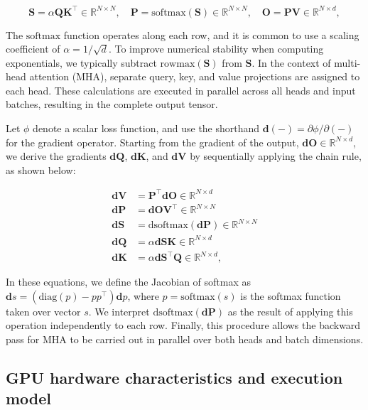 \begin{enumerate}
\begin{equation*}
  \mathbf{S} = \alpha \mathbf{Q} \mathbf{K}^\top \in \mathbb{R}^{N \times N}, \quad \mathbf{P} = \mathrm{softmax}(\mathbf{S}) \in \mathbb{R}^{N \times N}, \quad \mathbf{O} = \mathbf{P}\mathbf{V} \in \mathbb{R}^{N \times d},
\end{equation*}

The $\mathrm{softmax}$ function operates along each row, and it is common to use a scaling coefficient of $\alpha = 1/\sqrt{d}$. To improve numerical stability when computing exponentials, we typically subtract $\mathrm{rowmax}(\mathbf{S})$ from $\mathbf{S}$. In the context of multi-head attention (MHA), separate query, key, and value projections are assigned to each head. These calculations are executed in parallel across all heads and input batches, resulting in the complete output tensor.

Let $\phi$ denote a scalar loss function, and use the shorthand $\mathbf{d}(-) = \partial \phi / \partial (-)$ for the gradient operator. Starting from the gradient of the output, $\mathbf{dO} \in \mathbb{R}^{N \times d}$, we derive the gradients $\mathbf{dQ}$, $\mathbf{dK}$, and $\mathbf{dV}$ by sequentially applying the chain rule, as shown below:

\begin{align*}
  \mathbf{dV} &= \mathbf{P}^\top \mathbf{dO} \in \mathbb{R}^{N \times d} \\
  \mathbf{dP} &= \mathbf{dO} \mathbf{V}^\top \in \mathbb{R}^{N \times N} \\
  \mathbf{dS} &= \mathrm{dsoftmax} (\mathbf{dP}) \in \mathbb{R}^{N \times N} \\
  \mathbf{dQ} &= \alpha \mathbf{dS} \mathbf{K} \in \mathbb{R}^{N \times d} \\
  \mathbf{dK} &= \alpha \mathbf{dS}^\top \mathbf{Q} \in \mathbb{R}^{N \times d},
\end{align*}

In these equations, we define the Jacobian of softmax as $\mathbf{d}s = (\mathrm{diag}(p) - p p^\top)\mathbf{d}p$, where $p = \mathrm{softmax}(s)$ is the softmax function taken over vector $s$. We interpret $\mathrm{dsoftmax}(\mathbf{dP})$ as the result of applying this operation independently to each row. Finally, this procedure allows the backward pass for MHA to be carried out in parallel over both heads and batch dimensions.

\subsection{GPU hardware characteristics and execution model}
\label{subsec:hardware}


\end{enumerate}
